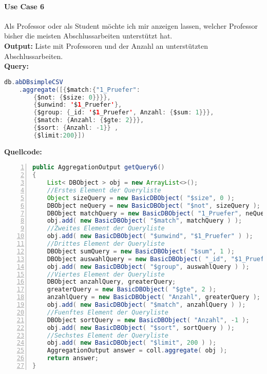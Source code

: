 \paragraph{Use Case 6} Als Professor oder als Student möchte ich mir anzeigen lassen, welcher Professor bisher die meisten Abschlussarbeiten unterstützt hat. \\
\textbf{Output:} Liste mit Professoren und der Anzahl an unterstützten Abschlussarbeiten. \\
\textbf{Query:}

\begin{lstlisting}[caption={Query zu Use Case 6},language=java,captionpos=t,numbers=none, numberstyle=\tiny,basicstyle=\scriptsize,breaklines=true]
db.abDBsimpleCSV
	.aggregate([{$match:{"1_Pruefer": 
		{$not: {$size: 0}}}},
		{$unwind: '$1_Pruefer'}, 
		{$group: {_id: '$1_Pruefer', Anzahl: {$sum: 1}}}, 
		{$match: {Anzahl: {$gte: 2}}},
		{$sort: {Anzahl: -1}} ,
		{$limit:200}])
\end{lstlisting}\label{lst:query6}

\textbf{Quellcode:}

\begin{lstlisting}[caption={Quellcode zu Use Case 6},language=java,captionpos=t,numbers=left, numberstyle=\tiny,basicstyle=\scriptsize,breaklines=true]
public AggregationOutput getQuery6()
{
    List< DBObject > obj = new ArrayList<>();
    //Erstes Element der Queryliste
    Object sizeQuery = new BasicDBObject( "$size", 0 );
    DBObject neQuery = new BasicDBObject( "$not", sizeQuery );
    DBObject matchQuery = new BasicDBObject( "1_Pruefer", neQuery );
    obj.add( new BasicDBObject( "$match", matchQuery ) );
    //Zweites Element der Queryliste
    obj.add( new BasicDBObject( "$unwind", "$1_Pruefer" ) );
    //Drittes Element der Queryliste
    DBObject sumQuery = new BasicDBObject( "$sum", 1 );
    DBObject auswahlQuery = new BasicDBObject( "_id", "$1_Pruefer" ).append( "Anzahl", sumQuery );
    obj.add( new BasicDBObject( "$group", auswahlQuery ) );
    //Viertes Element der Queryliste
    DBObject anzahlQuery, greaterQuery;
    greaterQuery = new BasicDBObject( "$gte", 2 );
    anzahlQuery = new BasicDBObject( "Anzahl", greaterQuery );
    obj.add( new BasicDBObject( "$match", anzahlQuery ) );
    //Fuenftes Element der Queryliste
    DBObject sortQuery = new BasicDBObject( "Anzahl", -1 );
    obj.add( new BasicDBObject( "$sort", sortQuery ) );
    //Sechstes Element der Queryliste
    obj.add( new BasicDBObject( "$limit", 200 ) );
    AggregationOutput answer = coll.aggregate( obj );
    return answer;
}
\end{lstlisting}\label{lst:query6code}

